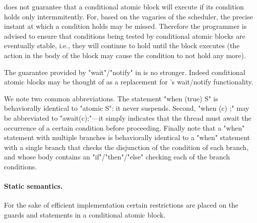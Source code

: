 {\Xten{} does not guarantee that a conditional atomic block
will execute if its condition holds only intermmitently. For, based on
the vagaries of the scheduler, the precise instant at which a
condition holds may be missed. Therefore the programmer is advised to
ensure that conditions being tested by conditional atomic blocks are
eventually stable, i.e., they will continue to hold until the block
executes (the action in the body of the block may cause the condition
to not hold any more).


\begin{rationale}
The guarantee provided by \xcd"wait"/\xcd"notify" in \java{} is no
stronger. Indeed conditional atomic blocks may be thought of as a
replacement for \java's wait/notify functionality.
\end{rationale} 

We note two common abbreviations. The statement \xcd"when (true) S" is
behaviorally identical to \xcd"atomic S": it never suspends. Second,
\xcd"when (c) {;}" may be abbreviated to \xcd"await(c);"---it
simply indicates that the thread must await the occurrence of a
certain condition before proceeding.  Finally note that a \xcd"when"
statement with multiple branches is behaviorally identical to a
\xcd"when" statement with a single branch that checks the disjunction of
the condition of each branch, and whose body contains an
\xcd"if"/\xcd"then"/\xcd"else" checking each of the branch conditions.

\paragraph{Static semantics.}
For the sake of efficient implementation certain restrictions are
placed on the guards and statements in a conditional atomic
block. 

}
